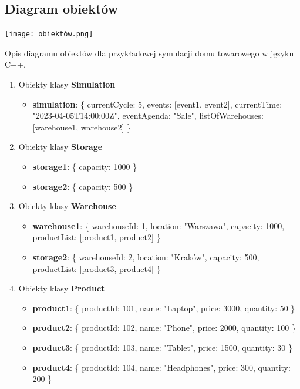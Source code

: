 \documentclass[11pt]{article}
\begin{document}
\newpage

\subsection{Diagram obiektów}

\texttt{[image: obiektów.png]}

Opis diagramu obiektów dla przykładowej symulacji domu towarowego w języku C++.

\begin{enumerate}

\item Obiekty klasy \textbf{Simulation}
\begin{itemize}
    \item \textbf{simulation}: \{ currentCycle: 5, events: [event1, event2], currentTime: "2023-04-05T14:00:00Z", eventAgenda: "Sale", listOfWarehouses: [warehouse1, warehouse2] \}
\end{itemize}

\item Obiekty klasy \textbf{Storage}
\begin{itemize}
    \item \textbf{storage1}: \{ capacity: 1000 \}
    \item \textbf{storage2}: \{ capacity: 500 \}
\end{itemize}

\item Obiekty klasy \textbf{Warehouse}
\begin{itemize}
    \item \textbf{warehouse1}: \{ warehouseId: 1, location: "Warszawa", capacity: 1000, productList: [product1, product2] \}
    \item \textbf{storage2}: \{ warehouseId: 2, location: "Kraków", capacity: 500, productList: [product3, product4] \}
\end{itemize}

\item Obiekty klasy \textbf{Product}
\begin{itemize}
    \item \textbf{product1}: \{ productId: 101, name: "Laptop", price: 3000, quantity: 50 \}
    \item \textbf{product2}: \{ productId: 102, name: "Phone", price: 2000, quantity: 100 \}
    \item \textbf{product3}: \{ productId: 103, name: "Tablet", price: 1500, quantity: 30 \}
    \item \textbf{product4}: \{ productId: 104, name: "Headphones", price: 300, quantity: 200 \}
\end{itemize}


\end{enumerate}
\end{document}
